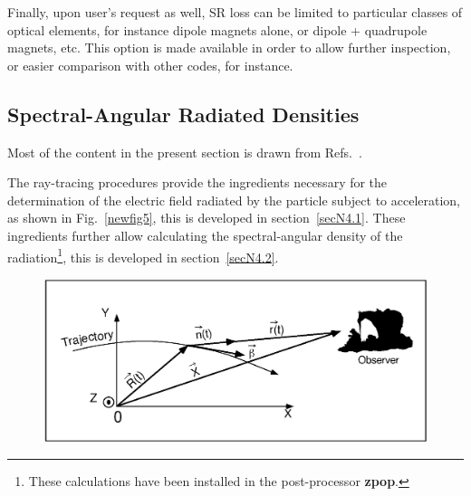 \bigskip

\noindent Finally, upon user's request as well,  SR loss can be limited to particular classes of optical 
elements, for instance dipole magnets alone, or dipole + quadrupole magnets, etc. This option 
is made available in order to allow further inspection, or easier comparison with other codes, for instance. 



\subsection{Spectral-Angular Radiated Densities}\label{secSRSpec}

Most of the content in the present section is drawn from Refs.~\protect\cite{FMSL/94-22,FMLPYellow,PALowFreq}.

\medskip

\noindent The ray-tracing procedures provide the ingredients necessary 
for the determination of the electric field radiated by the particle subject to
acceleration, as shown in Fig.~\ref{newfig5}, this is developed in section~\ref{secN4.1}. 
These ingredients further allow calculating the spectral-angular density of the 
radiation\footnote{These calculations have been installed in the 
post-processor  \textbf{zpop}. },   this is developed in section~\ref{secN4.2}. 


\begin{figure}[h]
\centering
\includegraphics[width=16cm]{NewFig5.ps} 
{\setlength{\captionwidth}{15cm}
 }
\end{figure}
%

